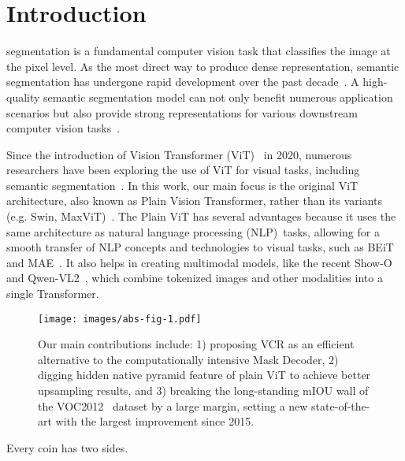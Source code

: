 \section{Introduction}
\label{sec:intro}


%
segmentation is a fundamental computer vision task that classifies the image at the pixel level.
As the most direct way to produce dense representation, semantic segmentation has undergone rapid development over the past decade~\cite{cFCN,cUNet,cPSPNet,cDeepLab,cDeepLabV3Plus,cNonLocal,cDualAttention,cCCNet,cOCR,cCAA,cMaskFormer,cMask2Former,cCAR,cSAR,cCART,cHFGD,cSRRNet,cDeepLabM}.
%
A high-quality semantic segmentation model can not only benefit numerous application scenarios but also provide strong representations for various downstream computer vision tasks~\cite{cPanopticDeepLab,cDPT,cPanopticFPN,cReELFA}.

Since the introduction of Vision Transformer (ViT)~\cite{cViT} in 2020, numerous researchers have been exploring the use of ViT for visual tasks, including semantic segmentation~\cite{cSegmenter,cSegViT,cRSSeg-ViT}.
%
In this work, our main focus is the original ViT architecture, also known as Plain Vision Transformer, rather than its variants (e.g. Swin, MaxViT)~\cite{cSwin,cMaxViT,cCPvT}.
%
The Plain ViT has several advantages because it uses the same architecture as natural language processing (NLP)~tasks, allowing for a smooth transfer of NLP concepts and technologies to visual tasks, such as BEiT~\cite{cBEiT} and MAE~\cite{cMAE}. 
%
It also helps in creating multimodal models, like the recent Show-O~\cite{cShow-O} and Qwen-VL2~\cite{cQwen-VL,cQwen-VL2}, which combine tokenized images and other modalities into a single Transformer.

\begin{figure}
    \centering
    \texttt{[image: images/abs-fig-1.pdf]}
    \caption{Our main contributions include: 
    1) proposing VCR as an efficient alternative to the computationally intensive Mask Decoder, 
    2) digging hidden native pyramid feature of plain ViT to achieve better upsampling results,
    and 3) breaking the long-standing mIOU wall of the VOC2012~\cite{cPascalVOC} dataset by a large margin, setting a new state-of-the-art with the largest improvement since 2015.}
    \label{fig:abs-1}
\end{figure}

Every coin has two sides.


